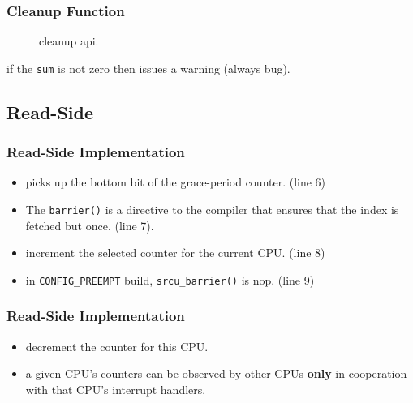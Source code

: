 \documentclass{beamer}
\begin{document}

\begin{frame}[t]
  \frametitle{Cleanup Function}

  \begin{figure}
      
    \caption{cleanup api.}
  \end{figure}

  if the \texttt{sum} is not zero then issues a warning (always bug).
  
\end{frame}


\subsection{Read-Side}


\begin{frame}[t]
  \frametitle{Read-Side Implementation}

    

  \begin{itemize}
  \item picks up the bottom bit of the grace-period counter. (line 6)
  \item The \texttt{barrier()} is a directive to the compiler that ensures that the index is
    fetched but once. (line 7).
  \item increment the selected counter for the current CPU. (line 8)
  \item in \texttt{CONFIG\_PREEMPT} build, \texttt{srcu\_barrier()} is nop. (line 9)
  \end{itemize}
  
\end{frame}


\begin{frame}[t]
  \frametitle{Read-Side Implementation}

  

  \begin{itemize}
  \item decrement the counter for this CPU.
  \item a given CPU's counters can be observed by other CPUs \textbf{only} in
    cooperation with that CPU's interrupt handlers.
  \end{itemize}
  
\end{frame}
\end{document}
